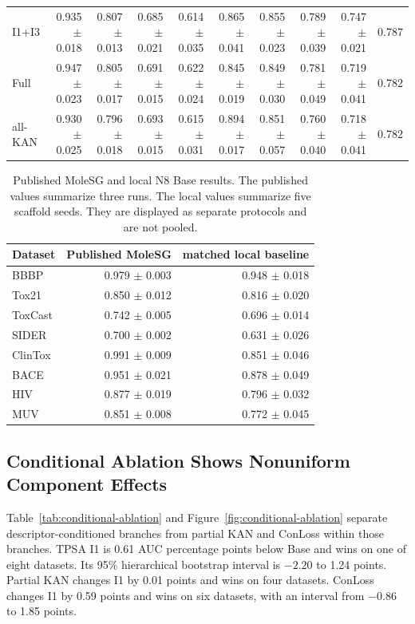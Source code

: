 \documentclass[journal=jcisd8,manuscript=article]{achemso}
\begin{document}
\begin{table}[t]
{\begin{tabular}{lrrrrrrrrr}
I1+I3 & 0.935 $\pm$ 0.018 & 0.807 $\pm$ 0.013 & 0.685 $\pm$ 0.021 & 0.614 $\pm$ 0.035 & 0.865 $\pm$ 0.041 & 0.855 $\pm$ 0.023 & 0.789 $\pm$ 0.039 & 0.747 $\pm$ 0.021 & 0.787 \\
Full & 0.947 $\pm$ 0.023 & 0.805 $\pm$ 0.017 & 0.691 $\pm$ 0.015 & 0.622 $\pm$ 0.024 & 0.845 $\pm$ 0.019 & 0.849 $\pm$ 0.030 & 0.781 $\pm$ 0.049 & 0.719 $\pm$ 0.041 & 0.782 \\
all-KAN & 0.930 $\pm$ 0.025 & 0.796 $\pm$ 0.018 & 0.693 $\pm$ 0.015 & 0.615 $\pm$ 0.031 & 0.894 $\pm$ 0.017 & 0.851 $\pm$ 0.057 & 0.760 $\pm$ 0.040 & 0.718 $\pm$ 0.041 & 0.782 \\
\bottomrule
\end{tabular}}
\end{table}

\begin{table}[t]
\centering
\caption{Published MoleSG and local N8 Base results. The published values summarize three runs. The local values summarize five scaffold seeds. They are displayed as separate protocols and are not pooled.}
\label{tab:molesg-comparison}
\begin{tabular}{lrr}
\toprule
Dataset & Published MoleSG & matched local baseline \\
\midrule
BBBP & 0.979 $\pm$ 0.003 & 0.948 $\pm$ 0.018 \\
Tox21 & 0.850 $\pm$ 0.012 & 0.816 $\pm$ 0.020 \\
ToxCast & 0.742 $\pm$ 0.005 & 0.696 $\pm$ 0.014 \\
SIDER & 0.700 $\pm$ 0.002 & 0.631 $\pm$ 0.026 \\
ClinTox & 0.991 $\pm$ 0.009 & 0.851 $\pm$ 0.046 \\
BACE & 0.951 $\pm$ 0.021 & 0.878 $\pm$ 0.049 \\
HIV & 0.877 $\pm$ 0.019 & 0.796 $\pm$ 0.032 \\
MUV & 0.851 $\pm$ 0.008 & 0.772 $\pm$ 0.045 \\
\bottomrule
\end{tabular}
\end{table}

\subsection{Conditional Ablation Shows Nonuniform Component Effects}

Table~\ref{tab:conditional-ablation} and Figure~\ref{fig:conditional-ablation} separate descriptor-conditioned branches from partial KAN and ConLoss within those branches. TPSA I1 is 0.61 AUC percentage points below Base and wins on one of eight datasets. Its 95\% hierarchical bootstrap interval is \(-2.20\) to 1.24 points. Partial KAN changes I1 by 0.01 points and wins on four datasets. ConLoss changes I1 by 0.59 points and wins on six datasets, with an interval from \(-0.86\) to 1.85 points.
\end{document}
